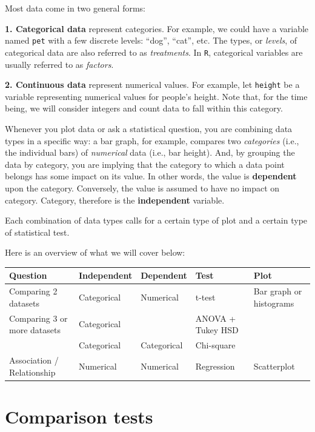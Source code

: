 \documentclass[]{book}
\begin{document}
Most data come in two general forms:

\textbf{1. Categorical data} represent categories. For example, we could have a variable named \texttt{pet} with a few discrete levels: ``dog'', ``cat'', etc. The types, or \emph{levels}, of categorical data are also referred to as \emph{treatments}. In \texttt{R}, categorical variables are usually referred to as \emph{factors}.

\textbf{2. Continuous data} represent numerical values. For example, let \texttt{height} be a variable representing numerical values for people's height. Note that, for the time being, we will consider integers and count data to fall within this category.

Whenever you plot data or ask a statistical question, you are combining data types in a specific way: a bar graph, for example, compares two \emph{categories} (i.e., the individual bars) of \emph{numerical} data (i.e., bar height). And, by grouping the data by category, you are implying that the category to which a data point belongs has some impact on its value. In other words, the value is \textbf{dependent} upon the category. Conversely, the value is assumed to have no impact on category. Category, therefore is the \textbf{independent} variable.

Each combination of data types calls for a certain type of plot and a certain type of statistical test.

Here is an overview of what we will cover below:

\begin{tabular}{l|l|l|l|l}
\hline
Question & Independent & Dependent & Test & Plot\\
\hline
Comparing 2 datasets & Categorical & Numerical & t-test & Bar graph or histograms\\
\hline
Comparing 3 or more datasets & Categorical &  & ANOVA + Tukey HSD & \\
\hline
 & Categorical & Categorical & Chi-square & \\
\hline
Association / Relationship & Numerical & Numerical & Regression & Scatterplot\\
\hline
\end{tabular}

\hypertarget{comparison-tests}{%
\section*{Comparison tests}\label{comparison-tests}}
\end{document}
